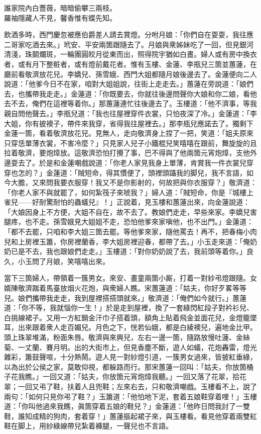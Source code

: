 \begin{myquote} 
誰家院內白薔薇，暗暗偷攀三兩枝。\\羅袖隱藏人不見，馨香惟有蝶先知。
\end{myquote} 

飲酒多時，西門慶忽被應伯爵差人請去賞燈。分咐月娘：「你們自在耍耍，我往應二哥家吃酒去來。」玳安、平安兩箇跟隨去了。月娘與衆姊妹吃了一回，但見銀河清淺，珠鬬爛斑，一輪團圓皎月從東而出，照得院宇猶如白晝。婦人或有房中換衣者，或有月下整粧者，或有燈前戴花者。惟有玉樓、金蓮、李瓶兒三箇並蕙蓮，在廳前看敬濟放花兒。李嬌兒、孫雪娥、西門大姐都隨月娘後邊去了。金蓮便向二人說道：「他爹今日不在家，咱對大姐姐說，往街上走走去。」蕙蓮在旁說道：「娘們去，也攜帶我走走。」金蓮道：「你既要去，你就往後邊問聲你大娘和你二娘，看他去不去，俺們在這裡等着你。」那蕙蓮連忙往後邊去了。玉樓道：「他不濟事，等我親自問他聲去。」李瓶兒道：「我也往屋裡穿件衣裳，只怕夜深了冷。」金蓮道：「李大姐，你有披襖子，帶件來我穿，省得我往屋裡去。」{}那李瓶兒應諾去了。{}獨剩下金蓮一箇，看着敬濟放花兒。見無人，走向敬濟身上捏了一把，{}笑道：「姐夫原來只穿恁單薄衣裳，不害冷麼？」只見家人兒子小鐵棍兒笑嘻嘻在跟前，舞旋旋的且拉着敬濟，要炮𤍤放。{}這敬濟恐怕打攪了事，巴不得與了他兩箇元宵炮𤍤，支他外邊耍去了。於是和金蓮嘲戲說道：「你老人家見我身上單薄，肯賞我一件衣裳兒穿穿也怎的？」金蓮道：「賊短命，得其慣便了，頭裡頭躡我的脚兒，我不言語，如今大膽，又來問我要衣服穿！我又不是你影射的，何故把與你衣服穿？」敬濟道：「你老人家不與就罷了，如何紮筏子來唬我？」婦人道：「賊短命，你是『城樓上雀兒——好耐驚耐怕的蟲蟻兒』！」正說着，見玉樓和蕙蓮出來，向金蓮說道：「大娘因身上不方便，大姐不自在，故不去了。教娘們走走，早些來家。李嬌兒害腿疼，也不走。孫雪娥見大姐姐不走，恐怕他爹來家嗔他，也不出門。」金蓮道：「都不去罷，只咱和李大姐三箇去罷。等他爹來家，隨他罵去！再不，把春梅小肉兒和上房裡玉簫，你房裡蘭香，李大姐房裡迎春，都帶了去。」小玉走來道：「俺奶奶已是不去，我也跟娘們走走。」玉樓道：「對你奶奶說了去，我前頭等着你。」良久，小玉問了月娘，笑嘻嘻出來。

當下三箇婦人，帶領着一簇男女。來安、畫童兩箇小厮，打着一對紗弔燈跟隨。女婿陳敬濟踹着馬臺放烟火花炮，與衆婦人瞧。宋蕙蓮道：「姑夫，你好歹畧等等兒。娘們攜帶我走走，我到屋裡搭搭頭就來。」敬濟道：「俺們如今就行。」蕙蓮道：「你不等，我就惱你一生！」{}於是走到屋裡，換了一套綠閃紅段子對衿衫兒、白挑線裙子。又用一方紅銷金汗巾子搭着頭，額角上貼着飛金並面花兒，金燈籠墜耳，出來跟着衆人走百媚兒。月色之下，恍若仙娥，都是白綾襖兒，遍地金比甲。頭上珠翠堆滿，粉面朱唇。敬濟與來興兒，左右一邊一箇，隨路放慢吐蓮、金絲菊、一丈蘭、賽月明。出的大街市上，但見香塵不斷，遊人如蟻，花炮轟雷，燈光雜彩，簫鼓聲喧，十分熱鬧。遊人見一對紗燈引道，一簇男女過來，皆披紅垂綠，以為出於公侯之家，莫敢仰視，都躲路而行。那宋蕙蓮一回叫：「姑夫，你放箇桶子花我瞧。」一回又道：「姑夫，你放箇元宵炮𤍤我聽。」一回又落了花翠，拾花翠；一回又弔了鞋，扶着人且兜鞋；左來右去，只和敬濟嘲戲。{}玉樓看不上，說了兩句：「如何只見你弔了鞋？」玉簫道：「他怕地下泥，套着五娘鞋穿着哩！」{}玉樓道：「你叫他過來我瞧，眞箇穿着五娘的鞋兒？」金蓮道：「他昨日問我討了一雙鞋，誰知成精的狗肉，套着穿！」蕙蓮摳起裙子來，與玉樓看。看見他穿着兩雙紅鞋在脚上，用紗綠線帶兒紮着褲腿，一聲兒也不言語。

